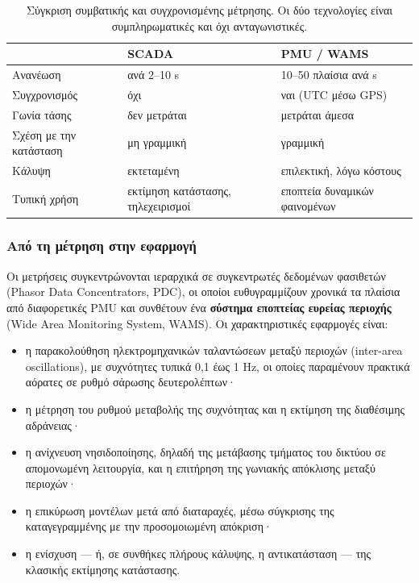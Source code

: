 \begin{table}[!htbp]
\centering
\begin{tabular}{lll}
\hline
 & SCADA & PMU / WAMS \\
\hline
Ανανέωση         & ανά 2--10 s        & 10--50 πλαίσια ανά s \\
Συγχρονισμός     & όχι                & ναι (UTC μέσω GPS) \\
Γωνία τάσης      & δεν μετράται       & μετράται άμεσα \\
Σχέση με την κατάσταση & μη γραμμική & γραμμική \\
Κάλυψη           & εκτεταμένη         & επιλεκτική, λόγω κόστους \\
Τυπική χρήση     & εκτίμηση κατάστασης, τηλεχειρισμοί & εποπτεία δυναμικών φαινομένων \\
\hline
\end{tabular}
\caption{Σύγκριση συμβατικής και συγχρονισμένης μέτρησης. Οι δύο τεχνολογίες είναι
συμπληρωματικές και όχι ανταγωνιστικές.}
\label{tab:scada-pmu}
\end{table}

\subsubsection*{Από τη μέτρηση στην εφαρμογή}

Οι μετρήσεις συγκεντρώνονται ιεραρχικά σε συγκεντρωτές δεδομένων φασιθετών (Phasor Data
Concentrators, PDC), οι οποίοι ευθυγραμμίζουν χρονικά τα πλαίσια από διαφορετικές PMU και
συνθέτουν ένα \textbf{σύστημα εποπτείας ευρείας περιοχής} (Wide Area Monitoring System,
WAMS). Οι χαρακτηριστικές εφαρμογές είναι:

\begin{itemize}
\item η παρακολούθηση ηλεκτρομηχανικών ταλαντώσεων μεταξύ περιοχών (inter-area
      oscillations), με συχνότητες τυπικά
      0,1 έως 1 Hz, οι οποίες παραμένουν πρακτικά αόρατες σε ρυθμό σάρωσης δευτερολέπτων·
\item η μέτρηση του ρυθμού μεταβολής της συχνότητας και η εκτίμηση της διαθέσιμης
      αδράνειας·
\item η ανίχνευση νησιδοποίησης, δηλαδή της μετάβασης τμήματος του δικτύου σε απομονωμένη
      λειτουργία, και η επιτήρηση της γωνιακής απόκλισης μεταξύ περιοχών·
\item η επικύρωση μοντέλων μετά από διαταραχές, μέσω σύγκρισης της καταγεγραμμένης με την
      προσομοιωμένη απόκριση·
\item η ενίσχυση — ή, σε συνθήκες πλήρους κάλυψης, η αντικατάσταση — της κλασικής εκτίμησης
      κατάστασης.
\end{itemize}

